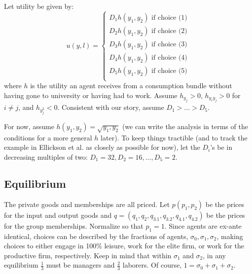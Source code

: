 \documentclass[12pt,letterpaper]{article}
\begin{document}
	Let utility be given by:
	\[
	u(y,l) = \begin{cases}
		D_1h(y_1,y_2)\text{ if choice (1)}  \\
		D_2h(y_1,y_2)\text{ if choice (2)} \\
		D_3h(y_1,y_2)\text{ if choice (3)} \\
		D_4h(y_1,y_2)\text{ if choice (4)} \\
		D_5h(y_1,y_2)\text{ if choice (5)} \\
	\end{cases}
	\]
	where $h$ is the utility an agent receives from a consumption bundle without having gone to university or having had to work.
	Assume $h_{y_j}>0$, $h_{y_iy_j}>0$ for $i\ne j$, and $h_{y_j^2}<0$.
	Consistent with our story, assume $D_1>\ldots> D_5$.
	
	For now, assume $h(y_1,y_2)=\sqrt{y_1,y_2}$ (we can write the analysis in terms of the conditions for a more general $h$ later).
	To keep things tractible (and to track the example in Ellickson et al. as closely as possible for now), let the $D_i$'s be in decreasing multiples of two: $D_1=32,D_2=16,\ldots, D_5=2$.
	
	\subsection{Equilibrium}
	
	The private goods and memberships are all priced.
	Let $p(p_1,p_2)$ be the prices for the input and output goods and $q=(q_1,q_2,q_{3.1},q_{3.2},q_{4.1},q_{4.2})$ be the prices for the group memberships.
	Normalize so that $p_1=1$.
	Since agents are ex-ante identical, choices can be described by the fractions of agents, $\sigma_0,\sigma_1,\sigma_2$, making choices to either engage in 100\% leisure, work for the elite firm, or work for the productive firm, respectively.
	Keep in mind that within $\sigma_1$ and $\sigma_2$, in any equilibrium $\frac{1}{3}$ must be managers and $\frac{2}{3}$ laborers.
	Of course, $1=\sigma_0+\sigma_1+\sigma_2$.
	
\end{document}
